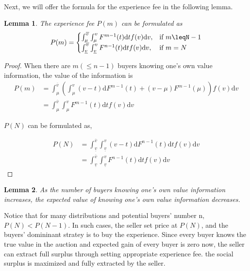 \documentclass[review]{elsarticle}
\newtheorem{lemma}{Lemma}
\begin{document}
Next, we will offer the formula for the experience fee in the following lemma.
\begin{lemma}
  The experience fee $P(m)$ can be formulated as 
  \begin{align}
 P(m)
= \begin{cases}\int_{\mu}^{\overline{v}}\int_{\mu}^vF^{m-1}(t)\mathrm{d}tf(v)\mathrm{d}v, & \textrm{if $m \leqN-1$}\\
\int_{\underline{v}}^{\overline{v}}\int_{\underline{v}}^v F^{n-1}(t)\mathrm{d}tf(v)\mathrm{d}v, &\textrm{if $m = N$}\\
\end{cases}
\end{align}
\end{lemma}
\begin{proof}
  When there are $m(\leq n-1)$ buyers knowing one's own value information, the value of the information is
\begin{align*}
P(m)&= \int_{\mu}^{\overline{v}}(\int_{\mu}^v (v-t)\mathrm{d}F^{m-1}(t)+(v-\mu)F^{m-1}(\mu))f(v)\mathrm{d}v\\
&= \int_{\mu}^{\overline{v}}\int_{\mu}^vF^{m-1}(t)\mathrm{d}tf(v)\mathrm{d}v
\end{align*}

$P(N)$ can be formulated as,

  \begin{align*}
P(N) &= \int_{\underline{v}}^{\overline{v}}\int_{\underline{v}}^v(v-t)\mathrm{d}F^{n-1}(t)\mathrm{d}tf(v)\mathrm{d}v \\
 &= \int_{\underline{v}}^{\overline{v}}\int_{\underline{v}}^v F^{n-1}(t)\mathrm{d}tf(v)\mathrm{d}v
  \end{align*}
\end{proof}

\begin{lemma}
As the number of buyers knowing one's own value information increases, the expected value of knowing one's own value information decreases.
\end{lemma}
Notice that for many distributions and potential buyers' number n,  $P(N) < P(N-1)$. In such cases, the seller set price at $P(N)$, and 
the buyers' domininant stratey is to buy the experience.
Since every buyer knows the true value in the auction and expected gain of every buyer is zero now, the seller can extract full surplus through setting appropriate experience fee.  the 
social surplus is maximized and fully extracted by the seller.
\end{document}
